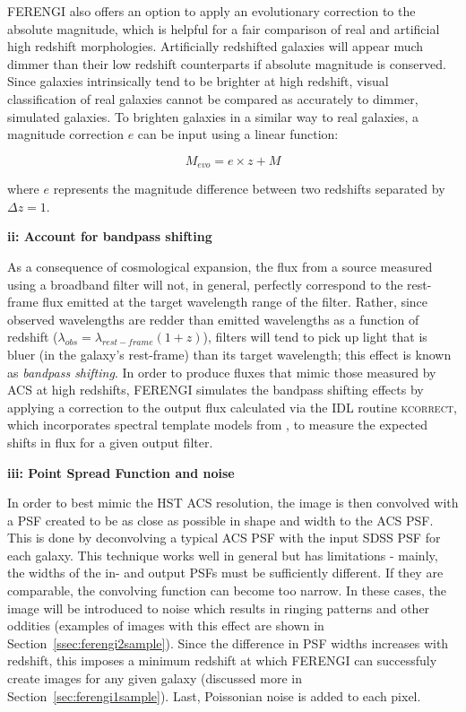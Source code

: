 FERENGI also offers an option to apply an evolutionary correction to the absolute magnitude, which is helpful for a fair comparison of real and artificial high redshift morphologies. Artificially redshifted galaxies will appear much dimmer than their low redshift counterparts if absolute magnitude is conserved.  Since galaxies intrinsically tend to be brighter at high redshift, visual classification of real galaxies cannot be compared as accurately to dimmer, simulated galaxies. To brighten galaxies in a similar way to real galaxies, a magnitude correction $e$ can be input using a linear function:

\begin{equation}
M_{evo} = e \times z + M
\label{eqn:ferengievolution}
\end{equation}

where $e$ represents the magnitude difference between two redshifts separated by $\Delta z=1$. 

\textbf{ii: Account for bandpass shifting} 

As a consequence of cosmological expansion, the flux from a source measured using a broadband filter will not, in general, perfectly correspond to the rest-frame flux emitted at the target wavelength range of the filter. Rather, since observed wavelengths are redder than emitted wavelengths as a function of redshift ($\lambda_{obs}=\lambda_{rest-frame}(1+z)$), filters will tend to pick up light that is bluer (in the galaxy's rest-frame) than its target wavelength; this effect is known as \emph{bandpass shifting}. In order to produce fluxes that mimic those measured by ACS at high redshifts, FERENGI simulates the bandpass shifting effects by applying a correction to the output flux calculated via the IDL routine \textsc{kcorrect}, which incorporates spectral template models from \citet{Bruzual2003}, to measure the expected shifts in flux for a given output filter.   

\textbf{iii: Point Spread Function and noise}

In order to best mimic the HST ACS resolution, the image is then convolved with a PSF created to be as close as possible in shape and width to the ACS PSF. This is done by deconvolving a typical ACS PSF with the input SDSS PSF for each galaxy. This technique works well in general but has limitations - mainly, the widths of the in- and output PSFs must be sufficiently different. If they are comparable, the convolving function can become too narrow. In these cases, the image will be introduced to noise which results in ringing patterns and other oddities (examples of images with this effect are shown in Section~\ref{ssec:ferengi2sample}). Since the difference in PSF widths increases with redshift, this imposes a minimum redshift at which FERENGI can successfuly create images for any given galaxy (discussed more in Section~\ref{sec:ferengi1sample}). Last, Poissonian noise is added to each pixel.



